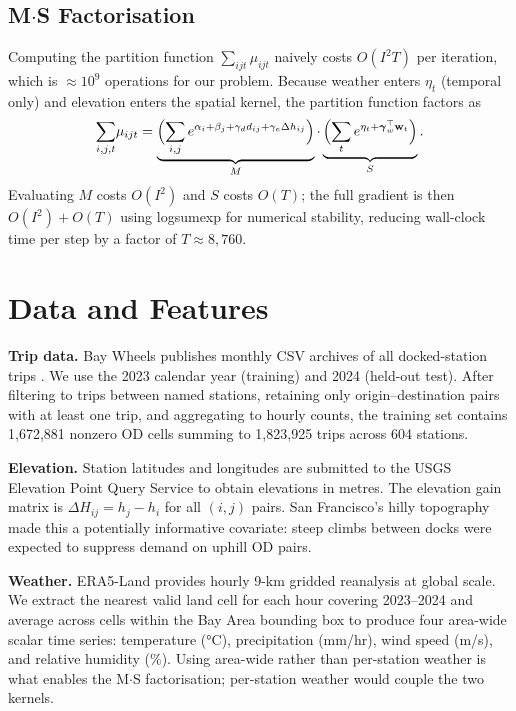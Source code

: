 \documentclass[conference,10pt]{IEEEtran}
\begin{document}
\subsection{M$\boldsymbol{\cdot}$S Factorisation}

Computing the partition function $\sum_{ijt}\mu_{ijt}$ naively costs
$O(I^2 T)$ per iteration, which is $\approx\!10^9$ operations for our
problem.  Because weather enters $\eta_t$ (temporal only) and
elevation enters the spatial kernel, the partition function factors as
\[
  \sum_{i,j,t}\!\mu_{ijt}
  = \underbrace{\Bigl(\sum_{i,j}e^{\alpha_i+\beta_j+\gamma_d d_{ij}
      +\gamma_e\Delta h_{ij}}\Bigr)}_{M}
    \cdot
    \underbrace{\Bigl(\sum_t e^{\eta_t+\boldsymbol\gamma_w^\top\mathbf{w}_t}\Bigr)}_{S}.
\]
Evaluating $M$ costs $O(I^2)$ and $S$ costs $O(T)$; the full gradient
is then $O(I^2)+O(T)$ using logsumexp for numerical stability, reducing
wall-clock time per step by a factor of $T\approx 8{,}760$.

\section{Data and Features}

\textbf{Trip data.}
Bay Wheels publishes monthly CSV archives of all docked-station trips
\cite{Munsell2023}.  We use the 2023 calendar year (training) and 2024
(held-out test).  After filtering to trips between named stations,
retaining only origin--destination pairs with at least one trip, and
aggregating to hourly counts, the training set contains 1{,}672{,}881
nonzero OD cells summing to 1{,}823{,}925 trips across 604 stations.

\textbf{Elevation.}
Station latitudes and longitudes are submitted to the USGS Elevation
Point Query Service \cite{USGS2023} to obtain elevations in metres.
The elevation gain matrix is $\Delta H_{ij} = h_j - h_i$ for all
$(i,j)$ pairs.  San Francisco's hilly topography made this a
potentially informative covariate: steep climbs between docks were
expected to suppress demand on uphill OD pairs.

\textbf{Weather.}
ERA5-Land \cite{Munoz2021} provides hourly 9-km gridded reanalysis at
global scale.  We extract the nearest valid land cell for each hour
covering 2023--2024 and average across cells within the Bay Area
bounding box to produce four area-wide scalar time series:
temperature (°C), precipitation (mm/hr), wind speed (m/s), and
relative humidity (\%).  Using area-wide rather than per-station
weather is what enables the M$\cdot$S factorisation; per-station
weather would couple the two kernels.
\end{document}
